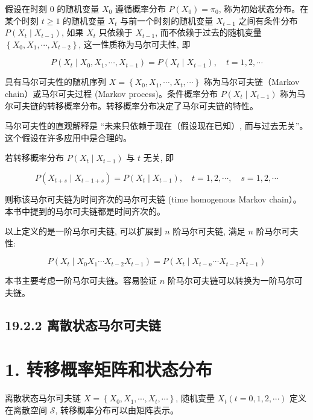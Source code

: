 \documentclass[10pt]{article}
\begin{document}
\begin{CJK*}{UTF8}{bsmi}
假设在时刻 0 的随机变量 $X_{0}$ 遵循概率分布 $P\left(X_{0}\right)=\pi_{0}$, 称为初始状态分布。在某个时刻 $t \geqslant 1$ 的随机变量 $X_{t}$ 与前一个时刻的随机变量 $X_{t-1}$ 之间有条件分布 $P\left(X_{t} \mid X_{t-1}\right)$, 如果 $X_{t}$ 只依赖于 $X_{t-1}$, 而不依赖于过去的随机变量 $\left\{X_{0}, X_{1}, \cdots, X_{t-2}\right\}$, 这一性质称为马尔可夫性, 即


\begin{equation*}
P\left(X_{t} \mid X_{0}, X_{1}, \cdots, X_{t-1}\right)=P\left(X_{t} \mid X_{t-1}\right), \quad t=1,2, \cdots \tag{19.6}
\end{equation*}


具有马尔可夫性的随机序列 $X=\left\{X_{0}, X_{1}, \cdots, X_{t}, \cdots\right\}$ 称为马尔可夫链（Markov chain）或马尔可夫过程 (Markov process)。条件概率分布 $P\left(X_{t} \mid X_{t-1}\right)$ 称为马尔可夫链的转移概率分布。转移概率分布决定了马尔可夫链的特性。

马尔可夫性的直观解释是 “未来只依赖于现在（假设现在已知）, 而与过去无关”。这个假设在许多应用中是合理的。

若转移概率分布 $P\left(X_{t} \mid X_{t-1}\right)$ 与 $t$ 无关, 即


\begin{equation*}
P\left(X_{t+s} \mid X_{t-1+s}\right)=P\left(X_{t} \mid X_{t-1}\right), \quad t=1,2, \cdots, \quad s=1,2, \cdots \tag{19.7}
\end{equation*}


则称该马尔可夫链为时间齐次的马尔可夫链 (time homogenous Markov chain）。本书中提到的马尔可夫链都是时间齐次的。

以上定义的是一阶马尔可夫链, 可以扩展到 $n$ 阶马尔可夫链, 满足 $n$ 阶马尔可夫性:


\begin{equation*}
P\left(X_{t} \mid X_{0} X_{1} \cdots X_{t-2} X_{t-1}\right)=P\left(X_{t} \mid X_{t-n} \cdots X_{t-2} X_{t-1}\right) \tag{19.8}
\end{equation*}


本书主要考虑一阶马尔可夫链。容易验证 $n$ 阶马尔可夫链可以转换为一阶马尔可夫链。

\subsection*{19.2.2 离散状态马尔可夫链}
\section*{1. 转移概率矩阵和状态分布}
离散状态马尔可夫链 $X=\left\{X_{0}, X_{1}, \cdots, X_{t}, \cdots\right\}$, 随机变量 $X_{t}(t=0,1,2, \cdots)$ 定义在离散空间 $\mathcal{S}$, 转移概率分布可以由矩阵表示。


\end{CJK*}
\end{document}
